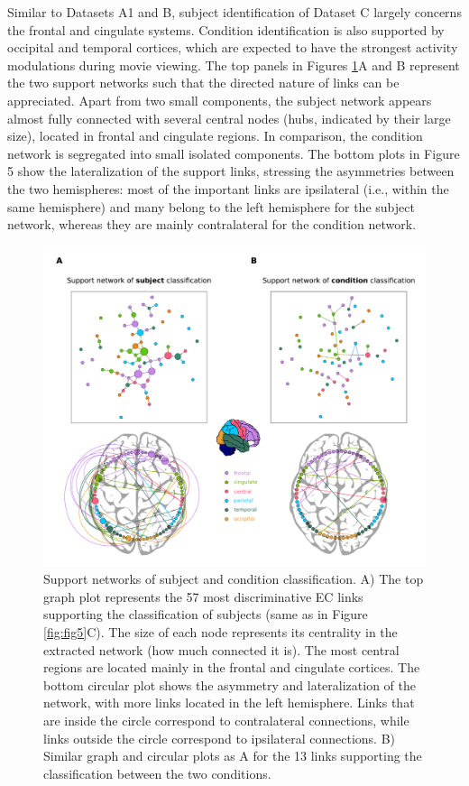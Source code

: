 \documentclass[12pt, a4paper, final, fleqn]{article}
\begin{document}
Similar to Datasets A1 and B, subject identification of Dataset C largely
concerns the frontal and cingulate systems. Condition identification is also
supported by occipital and temporal cortices, which are expected to have the
strongest activity modulations during movie viewing. The top panels in Figures
\ref{fig:fig6}A and B represent the two support networks such that the directed nature of
links can be appreciated. Apart from two small components, the subject network
appears almost fully connected with several central nodes (hubs, indicated by
their large size), located in frontal and cingulate regions. In comparison, the
condition network is segregated into small isolated components. The bottom
plots in Figure 5 show the lateralization of the support links, stressing the
asymmetries between the two hemispheres: most of the important links are
ipsilateral (i.e., within the same hemisphere) and many belong to the left
hemisphere for the subject network, whereas they are mainly contralateral for
the condition network.

\begin{figure}[htpb]
	\centering
	\includegraphics[width=0.9\columnwidth]{fig6}
	\caption{Support networks of subject and condition classification. A)
	The top graph plot represents the 57 most discriminative EC links
	supporting the classification of subjects (same as in Figure \ref{fig:fig5}C). The size of
each node represents its centrality in the extracted network (how much connected it is). The
most central regions are located mainly in the frontal and cingulate cortices.
The bottom circular plot shows the asymmetry and lateralization of the network,
with more links located in the left hemisphere. Links that are inside the
circle correspond to contralateral connections, while links outside the circle
correspond to ipsilateral connections. B) Similar graph and circular plots as A
for the 13 links supporting the classification between the two conditions.}
	\label{fig:fig6}
\end{figure}
\end{document}
